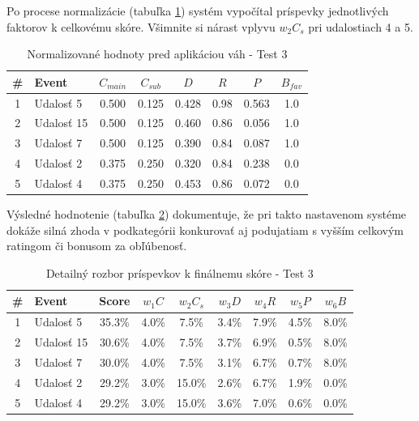 Po procese normalizácie (tabuľka \ref{tab:norm_test3}) systém vypočítal príspevky jednotlivých faktorov k celkovému skóre. Všimnite si nárast vplyvu $w_2 C_s$ pri udalostiach 4 a 5.

\begin{table}[H]
\centering
\small
\begin{tabular}{|c|l|c|c|c|c|c|c|}
\hline
\textbf{\#} & \textbf{Event} & $C_{main}$ & $C_{sub}$ & $D$ & $R$ & $P$ & $B_{fav}$ \\
\hline
1 & Udalosť 5  & 0.500 & 0.125 & 0.428 & 0.98 & 0.563 & 1.0 \\
2 & Udalosť 15 & 0.500 & 0.125 & 0.460 & 0.86 & 0.056 & 1.0 \\
3 & Udalosť 7  & 0.500 & 0.125 & 0.390 & 0.84 & 0.087 & 1.0 \\
4 & Udalosť 2  & 0.375 & 0.250 & 0.320 & 0.84 & 0.238 & 0.0 \\
5 & Udalosť 4  & 0.375 & 0.250 & 0.453 & 0.86 & 0.072 & 0.0 \\
\hline
\end{tabular}
\caption{Normalizované hodnoty pred aplikáciou váh - Test 3}
\label{tab:norm_test3}
\end{table}

Výsledné hodnotenie (tabuľka \ref{tab:vysledky_test3}) dokumentuje, že pri takto nastavenom systéme dokáže silná zhoda v podkategórii konkurovať aj podujatiam s vyšším celkovým ratingom či bonusom za obľúbenosť.

\begin{table}[H]
\centering
\small
\begin{tabular}{|c|l|c|c|c|c|c|c|c|}
\hline
\textbf{\#} & \textbf{Event} & \textbf{Score} & $w_1 C$ & $w_2 C_s$ & $w_3 D$ & $w_4 R$ & $w_5 P$ & $w_6 B$ \\
\hline
1 & Udalosť 5  & 35.3\% & 4.0\% & 7.5\%  & 3.4\% & 7.9\% & 4.5\% & 8.0\% \\
2 & Udalosť 15 & 30.6\% & 4.0\% & 7.5\%  & 3.7\% & 6.9\% & 0.5\% & 8.0\% \\
3 & Udalosť 7  & 30.0\% & 4.0\% & 7.5\%  & 3.1\% & 6.7\% & 0.7\% & 8.0\% \\
4 & Udalosť 2  & 29.2\% & 3.0\% & 15.0\% & 2.6\% & 6.7\% & 1.9\% & 0.0\% \\
5 & Udalosť 4  & 29.2\% & 3.0\% & 15.0\% & 3.6\% & 7.0\% & 0.6\% & 0.0\% \\
\hline
\end{tabular}
\caption{Detailný rozbor príspevkov k finálnemu skóre - Test 3}
\label{tab:vysledky_test3}
\end{table}

